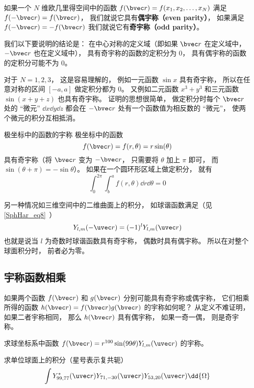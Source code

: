 

如果一个 $N$ 维欧几里得空间中的函数 $f(\bvec r) = f(x_1, x_2, \dots, x_N)$ 满足  $f(-\bvec r) = f(\bvec r)$， 我们就说它具有\textbf{偶宇称（even parity）}， 如果满足  $f(-\bvec r) = -f(\bvec r)$ 我们就说它有\textbf{奇宇称（odd parity）}。

我们以下要说明的结论是： 在中心对称的定义域（即如果 $\bvec r$ 在定义域中， $-\bvec r$ 也在定义域中）， 具有奇宇称的函数的定积分为 0， 具有偶宇称的函数的定积分可能不为 0。

对于 $N = 1, 2, 3$， 这是容易理解的， 例如一元函数 $\sin x$ 具有奇宇称， 所以在任意对称的区间 $[-a, a]$ 做定积分都为 0。 又例如二元函数 $x^3 + y^3$ 和三元函数 $\sin(x + y + z)$ 也具有奇宇称。 证明的思想很简单， 做定积分时每个 $\bvec r$ 处的 “微元” $\dd{x}\dd{y}\dd{z}$ 都会在 $-\bvec r$ 处有一个函数值为相反数的 “微元”， 使两个微元的积分互相抵消。

\begin{example}{极坐标中的函数的宇称}
极坐标中的函数
\begin{equation}\label{IntPry_eq1}
f(\bvec r) = f(r, \theta) = r\sin(\theta)
\end{equation}
具有奇宇称（将 $\bvec r$ 变为 $-\bvec r$， 只需要将 $\theta$ 加上 $\pi$ 即可， 而 $\sin(\theta + \pi) = -\sin\theta$）。 如果在一个圆环形区域上做定积分， 就有
\begin{equation}
\int_0^{2\pi} \int_b^a f(r, \theta) \dd{r} \dd{\theta} = 0
\end{equation}
\end{example}

另一种情况如三维空间中的二维曲面上的积分， 如球谐函数满足（见\autoref{SphHar_eq8}~）
\begin{equation}\label{IntPry_eq3}
Y_{l,m}(-\uvec r) = (-1)^l Y_{l,m}(\uvec r)
\end{equation}
也就是说当 $l$ 为奇数时球谐函数具有奇宇称， 偶数时具有偶宇称。 所以在对整个球面积分时， 前者必为零。

\subsection{宇称函数相乘}
如果两个函数 $f(\bvec r)$ 和 $g(\bvec r)$ 分别可能具有奇宇称或偶宇称， 它们相乘所得的函数 $h(\bvec r) = f(\bvec r) g(\bvec r)$ 的宇称如何呢？ 从定义不难证明， 如果二者宇称相同， 那么 $h(\bvec r)$ 具有偶宇称， 如果一奇一偶， 则是奇宇称。

\begin{exercise}{}
求球坐标系中函数 $f(\bvec r) = r^{100}\sin(99\theta) Y_{l, m}(\uvec r)$ 的宇称。
\end{exercise}

\begin{exercise}{}
求单位球面上的积分（星号表示复共轭）
\begin{equation}
\int Y_{99, 77}^*(\uvec r) Y_{71, -30}(\uvec r) Y_{53, 20}(\uvec r) \dd{\Omega}
\end{equation}
\end{exercise}

